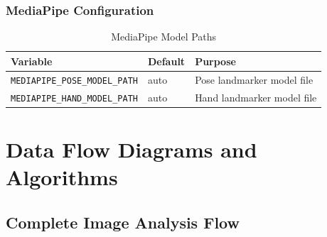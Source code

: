 \documentclass[12pt,a4paper]{book}
\begin{document}
\begin{itemize}
\subsection{MediaPipe Configuration}

\begin{table}[H]
\centering
\captionsetup{justification=centering}
\caption{MediaPipe Model Paths}
\begin{tabular}{|l|l|p{4cm}|}
\hline
\textbf{Variable} & \textbf{Default} & \textbf{Purpose} \\
\hline
\texttt{MEDIAPIPE\_POSE\_MODEL\_PATH} & auto & Pose landmarker model file \\
\hline
\texttt{MEDIAPIPE\_HAND\_MODEL\_PATH} & auto & Hand landmarker model file \\
\hline
\end{tabular}
\end{table}

\chapter{Data Flow Diagrams and Algorithms}
\label{ch:dataflow}

\section{Complete Image Analysis Flow}


\end{itemize}
\end{document}

